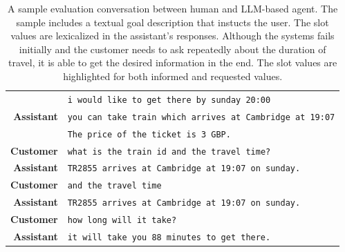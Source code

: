 \begin{table}[tp]
\begin{tabular}{r|l}
        & \texttt{i would like to get there by {\color{cyan!80!yellow!80!black!100 }sunday 20:00}} \\
        \textbf{Assistant} & \texttt{you can take train which arrives at Cambridge at  {\color{orange!50!yellow!90!black!100!}19:07}} \\
        & \texttt{The price of the ticket is {\color{orange!50!yellow!90!black!100!}3 GBP}.} \\
        \textbf{Customer} & \texttt{what is the {\color{orange!50!yellow!90!black!100!}train id} and the {\color{orange!50!yellow!90!black!100!}travel time?}} \\
        \textbf{Assistant} & \texttt{{\color{orange!50!yellow!90!black!100!}TR2855} arrives at Cambridge at 19:07 on sunday.} \\
        \textbf{Customer} & \texttt{and the travel time} \\
        \textbf{Assistant} & \texttt{{\color{red!100!yellow!90!black!100!}TR2855 arrives at Cambridge at 19:07 on sunday.}} \\
        \textbf{Customer} & \texttt{how long will it take?} \\
        \textbf{Assistant} & \texttt{it will take you {\color{orange!50!yellow!90!black!100!}88 minutes} to get there. }\\
        \bottomrule
    \end{tabular}
    \caption{A sample evaluation conversation between human and LLM-based agent. The sample includes a textual goal description that instucts the user. The slot values are lexicalized in the assistant's responses. Although the systems {\color{red!100!yellow!90!black!100!}fails initially} and the customer needs to ask repeatedly about the duration of travel, it is able to get the desired information in the end. The slot values are highlighted for both {\color{cyan!80!yellow!80!black!100 }informed} and {\color{orange!50!yellow!90!black!100!}requested} values.}
    \label{07:tab:human-1}
\end{table}

